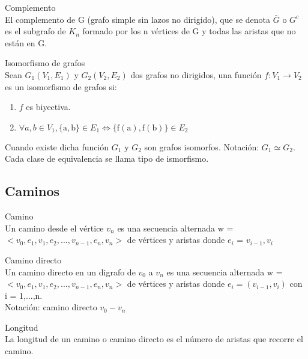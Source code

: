 \documentclass{article}
\begin{document}
\begin{defn}
Complemento \\ El complemento de G (grafo simple sin lazos no dirigido), que se denota $\bar{G}$ o $G^{c}$ es el subgrafo de $K_{n}$ formado por los n vértices de G y todas las aristas que no están en $\mathrm{G}$.
\end{defn}

\begin{defn}
Isomorfismo de grafos \\ Sean $G_{1}\left(V_{1}, E_{1}\right)$ y $G_{2}\left(V_{2}, E_{2}\right)$ dos grafos no dirigidos, una función $f: V_{1} \rightarrow V_{2}$ es un isomorfismo de grafos si:
\begin{enumerate}
    \item $f$ es biyectiva.
    \item $\forall a, b \in V_{1},\{\mathrm{a}, \mathrm{b}\} \in E_{1} \Leftrightarrow\{\mathrm{f}(\mathrm{a}), \mathrm{f}(\mathrm{b})\} \in E_{2}$
\end{enumerate}
Cuando existe dicha función $G_{1}$ y $G_{2}$ son grafos isomorfos. Notación: $G_{1} \simeq G_{2} .$ Cada clase de equivalencia se llama tipo de ismorfismo.
\end{defn}

\subsection{Caminos}

\begin{defn}
Camino \\ Un camino desde el vértice $v_{n}$ es una secuencia alternada w = $< v_{0}, e_{1}, v_{1}, e_{2},..., v_{n-1}, e_{n}, v_{n} >$ de vértices y aristas donde $e_{i}$ = {$v_{i-1}, v_{i}$}
\end{defn}

\begin{defn}
Camino directo \\ Un camino directo en un digrafo de $v_{0}$ a $v_{n}$ es una secuencia alternada w = $< v_{0}, e_{1}, v_{1}, e_{2},..., v_{n-1}, e_{n}, v_{n} >$ de vértices y aristas donde $e_{i} = (v_{i-1}, v_{i})$ con i = 1,...,n.\\
Notación: camino directo $v_{0}-v_{n}$
\end{defn}

\begin{defn}
Longitud \\ La longitud de un camino o camino directo es el número de aristas que recorre el camino.
\end{defn}
\end{document}

